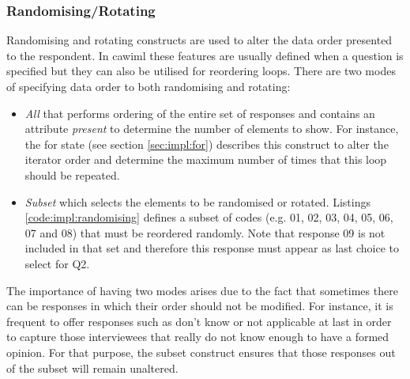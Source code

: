 	\subsubsection{Randomising/Rotating}\label{sec:impl:Randomising}
		Randomising and rotating constructs are used to alter the data order presented to the respondent. In \gls{cawiml} these features are usually defined when a question is specified but they can also be utilised for reordering loops. There are two modes of specifying data order to both randomising and rotating: 
		\begin{itemize}
			\item \emph{All} that performs ordering of the entire set of responses and contains an attribute \emph{present} to determine the number of elements to show. For instance, the for state (see section \ref{sec:impl:for}) describes this construct to alter the iterator order and determine the maximum number of times that this loop should be repeated.
			\item \emph{Subset} which selects the elements to be randomised or rotated. Listings \ref{code:impl:randomising} defines a subset of codes (e.g. 01, 02, 03, 04, 05, 06, 07 and 08) that must be reordered randomly. Note that response 09 is not included in that set and therefore this response must appear as last choice to select for Q2. 
		\end{itemize}

		The importance of having two modes arises due to the fact that sometimes there can be responses in which their order should not be modified. For instance, it is frequent to offer responses such as don't know or not applicable at last in order to capture those interviewees that really do not know enough to have a formed opinion. For that purpose, the subset construct ensures that those responses out of the subset will remain unaltered.

		